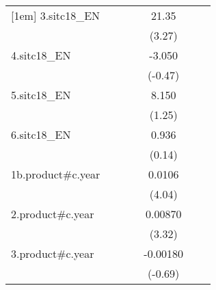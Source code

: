 {\begin{tabular}{l*{6}{c}}
[1em]
3.sitc18\_EN         &                     &                     &                     &       21.35\sym{**} &                     &                     \\
                    &                     &                     &                     &      (3.27)         &                     &                     \\
[1em]
4.sitc18\_EN         &                     &                     &                     &      -3.050         &                     &                     \\
                    &                     &                     &                     &     (-0.47)         &                     &                     \\
[1em]
5.sitc18\_EN         &                     &                     &                     &       8.150         &                     &                     \\
                    &                     &                     &                     &      (1.25)         &                     &                     \\
[1em]
6.sitc18\_EN         &                     &                     &                     &       0.936         &                     &                     \\
                    &                     &                     &                     &      (0.14)         &                     &                     \\
[1em]
1b.product#c.year   &                     &                     &                     &      0.0106\sym{***}&                     &                     \\
                    &                     &                     &                     &      (4.04)         &                     &                     \\
[1em]
2.product#c.year    &                     &                     &                     &     0.00870\sym{***}&                     &                     \\
                    &                     &                     &                     &      (3.32)         &                     &                     \\
[1em]
3.product#c.year    &                     &                     &                     &    -0.00180         &                     &                     \\
                    &                     &                     &                     &     (-0.69)         &                     &                     \\

\end{tabular}}

